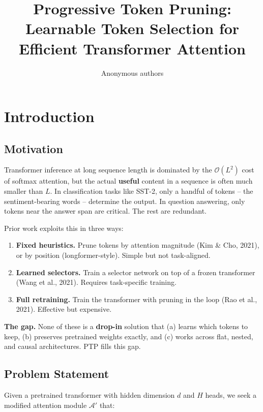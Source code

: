\title{\textbf{Progressive Token Pruning: Learnable Token Selection for Efficient Transformer Attention}}

\author{Anonymous authors}



\section{Introduction}

\subsection{Motivation}

Transformer inference at long sequence length is dominated by the 
$\mathcal{O}(L^2)$ cost of softmax attention, but the actual \textbf{useful} 
content in a sequence is often much smaller than $L$. In classification 
tasks like SST-2, only a handful of tokens -- the sentiment-bearing words -- 
determine the output. In question answering, only tokens near the answer 
span are critical. The rest are redundant.

Prior work exploits this in three ways:

\begin{enumerate}
\item \textbf{Fixed heuristics.} Prune tokens by attention magnitude (Kim \& Cho,
  2021), or by position (longformer-style). Simple but not task-aligned.

\item \textbf{Learned selectors.} Train a selector network on top of a frozen
  transformer (Wang et al., 2021). Requires task-specific training.

\item \textbf{Full retraining.} Train the transformer with pruning in the loop
  (Rao et al., 2021). Effective but expensive.

\end{enumerate}
\textbf{The gap.} None of these is a \textbf{drop-in} solution that (a) learns which 
tokens to keep, (b) preserves pretrained weights exactly, and (c) works 
across flat, nested, and causal architectures. PTP fills this gap.

\subsection{Problem Statement}

Given a pretrained transformer with hidden dimension $d$ and $H$ heads, we 
seek a modified attention module $\mathcal{A}'$ that:

